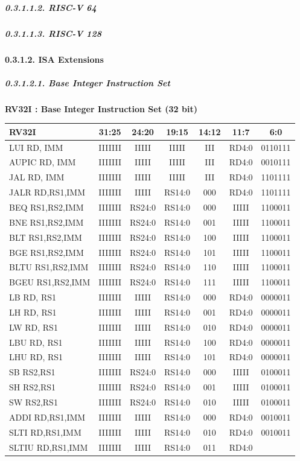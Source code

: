 \documentclass[
]{article}
\begin{document}
\hypertarget{risc-v-64}{%
\subparagraph{0.3.1.1.2. RISC-V 64}\label{risc-v-64}}

\hypertarget{risc-v-128}{%
\subparagraph{0.3.1.1.3. RISC-V 128}\label{risc-v-128}}

\hypertarget{isa-extensions}{%
\paragraph{0.3.1.2. ISA Extensions}\label{isa-extensions}}

\hypertarget{base-integer-instruction-set}{%
\subparagraph{0.3.1.2.1. Base Integer Instruction
Set}\label{base-integer-instruction-set}}

\textbf{RV32I : Base Integer Instruction Set (32 bit)}

\begin{longtable}[]{@{}lcccccc@{}}
\toprule
RV32I & 31:25 & 24:20 & 19:15 & 14:12 & 11:7 & 6:0\tabularnewline
\midrule
\endhead
LUI RD, IMM & IIIIIII & IIIII & IIIII & III & RD4:0 &
0110111\tabularnewline
AUPIC RD, IMM & IIIIIII & IIIII & IIIII & III & RD4:0 &
0010111\tabularnewline
JAL RD, IMM & IIIIIII & IIIII & IIIII & III & RD4:0 &
1101111\tabularnewline
JALR RD,RS1,IMM & IIIIIII & IIIII & RS14:0 & 000 & RD4:0 &
1101111\tabularnewline
BEQ RS1,RS2,IMM & IIIIIII & RS24:0 & RS14:0 & 000 & IIIII &
1100011\tabularnewline
BNE RS1,RS2,IMM & IIIIIII & RS24:0 & RS14:0 & 001 & IIIII &
1100011\tabularnewline
BLT RS1,RS2,IMM & IIIIIII & RS24:0 & RS14:0 & 100 & IIIII &
1100011\tabularnewline
BGE RS1,RS2,IMM & IIIIIII & RS24:0 & RS14:0 & 101 & IIIII &
1100011\tabularnewline
BLTU RS1,RS2,IMM & IIIIIII & RS24:0 & RS14:0 & 110 & IIIII &
1100011\tabularnewline
BGEU RS1,RS2,IMM & IIIIIII & RS24:0 & RS14:0 & 111 & IIIII &
1100011\tabularnewline
LB RD, RS1 & IIIIIII & IIIII & RS14:0 & 000 & RD4:0 &
0000011\tabularnewline
LH RD, RS1 & IIIIIII & IIIII & RS14:0 & 001 & RD4:0 &
0000011\tabularnewline
LW RD, RS1 & IIIIIII & IIIII & RS14:0 & 010 & RD4:0 &
0000011\tabularnewline
LBU RD, RS1 & IIIIIII & IIIII & RS14:0 & 100 & RD4:0 &
0000011\tabularnewline
LHU RD, RS1 & IIIIIII & IIIII & RS14:0 & 101 & RD4:0 &
0000011\tabularnewline
SB RS2,RS1 & IIIIIII & RS24:0 & RS14:0 & 000 & IIIII &
0100011\tabularnewline
SH RS2,RS1 & IIIIIII & RS24:0 & RS14:0 & 001 & IIIII &
0100011\tabularnewline
SW RS2,RS1 & IIIIIII & RS24:0 & RS14:0 & 010 & IIIII &
0100011\tabularnewline
ADDI RD,RS1,IMM & IIIIIII & IIIII & RS14:0 & 000 & RD4:0 &
0010011\tabularnewline
SLTI RD,RS1,IMM & IIIIIII & IIIII & RS14:0 & 010 & RD4:0 &
0010011\tabularnewline
SLTIU RD,RS1,IMM & IIIIIII & IIIII & RS14:0 & 011 & RD4:0 &

\end{longtable}
\end{document}
